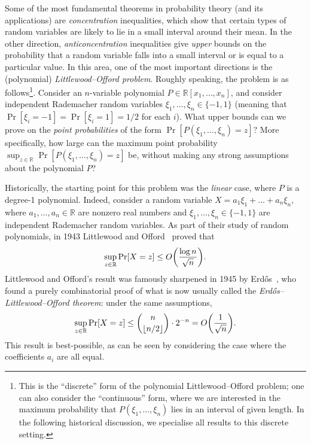 \documentclass[english]{article}
\theoremstyle{remark}
\numberwithin{equation}{section}
\numberwithin{figure}{section}
\newcommand{\RR}{\mathbb{R}}
\newcommand{\mb}{\mathbb}
\let\originalleft\left
\let\originalright\right
\renewcommand{\left}{\mathopen{}\mathclose\bgroup\originalleft}
\renewcommand{\right}{\aftergroup\egroup\originalright}
\begin{document}
\makeatletter
\newcommand*{\transpose}{%
  {\mathpalette\@transpose{}}%
}
\newcommand*{\@transpose}[2]{%
  \raisebox{\depth}{$\m@th#1\intercal$}%
}
\makeatother

Some of the most fundamental theorems in probability theory (and its applications) are \emph{concentration} inequalities, which show that certain types of random variables are likely to lie in a small interval around their mean. In the other direction, \emph{anticoncentration} inequalities give \emph{upper} bounds on the probability that a random variable falls into a small interval or is equal to a particular value. In this area, one of the most important directions is the (polynomial) \emph{Littlewood--Offord problem}. Roughly speaking, the problem is as follows\footnote{This is the ``discrete'' form of the polynomial Littlewood--Offord problem; one can also consider the ``continuous'' form, where we are interested in the maximum probability that $P(\xi_1,\dots,\xi_n)$ lies in an interval of given length. In the following historical discussion, we specialise all results to this discrete setting.}. Consider an $n$-variable polynomial $P\in \mb R[x_1,\dots,x_n]$, and consider independent Rademacher random variables $\xi_1,\dots,\xi_n\in\{-1,1\}$ (meaning that $\Pr[\xi_{i}=-1]=\Pr[\xi_{i}=1]=1/2$ for each $i$). What upper bounds can we prove on the \emph{point probabilities} of the form $\Pr[P(\xi_1,\dots,\xi_n)=z]$? More specifically, how large can the maximum point probability $\sup_{z\in \RR} \Pr[P(\xi_1,\dots,\xi_n)=z]$ be, without making any strong assumptions about the polynomial $P$?

Historically, the starting point for this problem was the \emph{linear} case, where $P$ is a degree-1 polynomial. Indeed, consider a random variable $X=a_{1}\xi_{1}+\dots+a_{n}\xi_{n}$, where
$a_{1},\dots,a_{n}\in\RR$ are nonzero real numbers and $\xi_{1},\dots,\xi_{n}\in\{-1,1\}$
are independent Rademacher random variables. As part of their study of random polynomials, in 1943
Littlewood and Offord~\cite{LO43} proved that
\[
\sup_{z\in\RR}\Pr[X=z]\le O\left(\frac{\log n}{\sqrt{n}}\right).
\]
Littlewood and Offord's result was famously sharpened in 1945 by Erd\H os~\cite{Erd45},
who found a purely combinatorial proof of what is now usually called the \emph{Erd\H os--Littlewood--Offord
theorem}: under the same assumptions,
\begin{equation}\label{eq:elo}
\sup_{z\in\mb R}\Pr[X=z]\le\binom{n}{\lfloor n/2\rfloor}\cdot 2^{-n}=O\left(\frac{1}{\sqrt{n}}\right).
\end{equation}
This result is best-possible, as can be seen by considering the case
where the coefficients $a_{i}$ are all equal.
\end{document}
